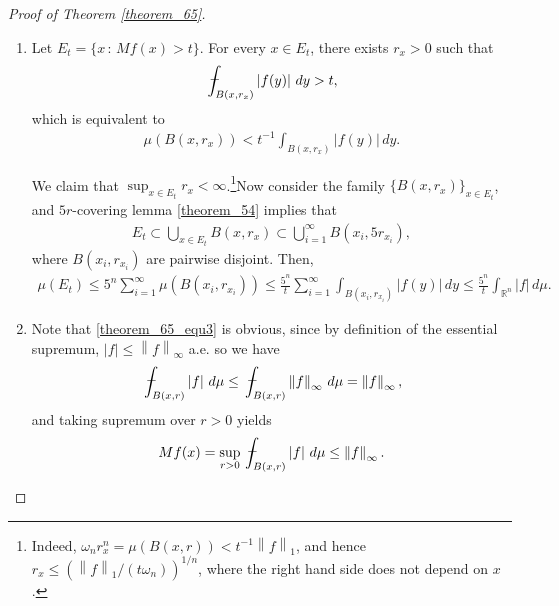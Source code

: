 \documentclass[11pt]{book}
\theoremstyle{definition}
\numberwithin{equation}{chapter}
\def\avint{\,\ThisStyle{\ensurestackMath{%
  \stackinset{c}{.2\LMpt}{c}{1\LMpt}{\SavedStyle-}{\SavedStyle\phantom{\int}}}%
  \setbox0=\hbox{$\SavedStyle\int\,$}\kern-\wd0}\int}
\begin{document}
\begin{proof}[Proof of Theorem \ref{theorem_65}]
~\begin{enumerate}[label=(\alph*)]
    \item Let $E_t = \{x \,:\, Mf(x) > t\}$. For every $x \in E_t$, there exists $r_x > 0$ such that
    \begin{align*}
        \avint_{B(x,r_x)} \left|f(y)\right| \,dy > t,
    \end{align*}
    which is equivalent to 
    \begin{align*}
        \mu(B(x,r_x)) < t^{-1} \int_{B(x,r_x)} \left|f(y)\right| \,dy.
    \end{align*}
    
    We claim that $\sup_{x \in E_t} r_x < \infty$.\footnote{Indeed, $\omega_n r_x^n = \mu(B(x,r)) < t^{-1} \left\|f\right\|_1$, and hence $r_x \leq \left(\left\|f\right\|_1/(t\omega_n)\right)^{1/n}$, where the right hand side does not depend on $x$.}Now consider the family $\{B(x,r_x)\}_{x \in E_t}$, and $5r$-covering lemma \ref{theorem_54} implies that 
    \begin{align*}
        E_t \subset \bigcup_{x\in E_t} B(x,r_x) \subset \bigcup^\infty_{i=1} B(x_i,5r_{x_i}),
    \end{align*}
    where $B(x_i,r_{x_i})$ are pairwise disjoint. Then,
    \begin{align*}
        \mu(E_t) \leq 5^n \sum^\infty_{i=1} \mu(B(x_i,r_{x_i})) \leq \frac{5^n}{t} \sum^\infty_{i=1} \int_{B(x_i,r_{x_i})} \left|f(y)\right| \,dy \leq \frac{5^n}{t} \int_{\mathbb{R}^n} \left|f\right| \,d\mu.
    \end{align*}
    
    \item Note that \eqref{theorem_65_equ3} is obvious, since by definition of the essential supremum, $\left|f\right| \leq \left\|f\right\|_\infty$ a.e. so we have
    \begin{align*}
        \avint_{B(x,r)} \left|f\right| \,d\mu \leq \avint_{B(x,r)} \left\|f\right\|_\infty \,d\mu = \left\|f\right\|_\infty,
    \end{align*}
    and taking supremum over $r > 0$ yields
    \begin{align*}
        Mf(x) = \sup_{r > 0} \avint_{B(x,r)} \left|f\right| \,d\mu \leq \left\|f\right\|_\infty.
    \end{align*}
    

\end{enumerate}
\end{proof}
\end{document}
